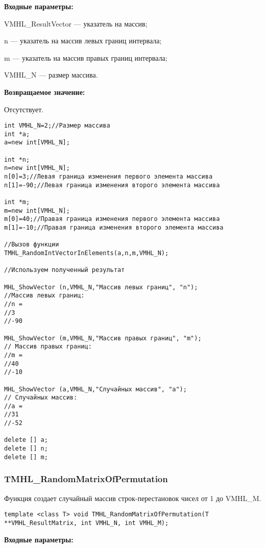 \documentclass[a4paper,12pt]{article}
\begin{document}
\textbf{Входные параметры:}
 
VMHL\_ResultVector --- указатель на массив;
 
n --- указатель на массив левых границ интервала;
 
m --- указатель на массив правых границ интервала;
 
VMHL\_N --- размер массива.

\textbf{Возвращаемое значение:}

Отсутствует.


\begin{lstlisting}[label=code_use_TMHL_RandomIntVectorInElements,caption=Пример использования]
int VMHL_N=2;//Размер массива
int *a;
a=new int[VMHL_N];

int *n;
n=new int[VMHL_N];
n[0]=3;//Левая граница изменения первого элемента массива
n[1]=-90;//Левая граница изменения второго элемента массива

int *m;
m=new int[VMHL_N];
m[0]=40;//Правая граница изменения первого элемента массива
m[1]=-10;//Правая граница изменения второго элемента массива

//Вызов функции
TMHL_RandomIntVectorInElements(a,n,m,VMHL_N);

//Используем полученный результат

MHL_ShowVector (n,VMHL_N,"Массив левых границ", "n");
//Массив левых границ:
//n =
//3
//-90

MHL_ShowVector (m,VMHL_N,"Массив правых границ", "m");
// Массив правых границ:
//m =
//40
//-10

MHL_ShowVector (a,VMHL_N,"Случайных массив", "a");
// Случайных массив:
//a =
//31
//-52

delete [] a;
delete [] n;
delete [] m;
\end{lstlisting}

\subsubsection{TMHL\_RandomMatrixOfPermutation}\label{TMHL_RandomMatrixOfPermutation}

Функция создает случайный массив строк-перестановок чисел от 1 до VMHL\_M.


\begin{lstlisting}[label=code_syntax_TMHL_RandomMatrixOfPermutation,caption=Синтаксис]
template <class T> void TMHL_RandomMatrixOfPermutation(T **VMHL_ResultMatrix, int VMHL_N, int VMHL_M);
\end{lstlisting}

\textbf{Входные параметры:}
 
\end{document}
